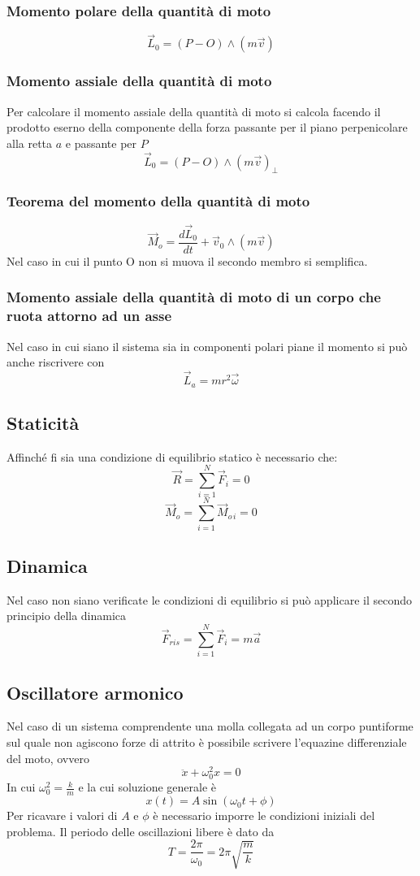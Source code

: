 \documentclass[12pt,a4paper]{report}
\begin{document}
		\subsubsection{Momento polare della quantità di moto}
		\[\vec{L}_{0}=(P-O)\wedge(m\vec{v})\]
		\subsubsection{Momento assiale della quantità di moto}
Per calcolare il momento assiale della quantità di moto si calcola facendo il prodotto eserno della componente della forza passante per il piano perpenicolare alla retta $a$ e passante per $P$
		\[ \vec{L}_{0}=(P-O)\wedge(m\vec{v})_{\perp} \]
		\subsubsection{Teorema del momento della quantità di moto}
		\[\vec{M}_{o} = \frac{d\vec{L}_{0}}{dt} + \vec{v}_{0}\wedge(m\vec{v})\]
Nel caso in cui il punto O non si muova il secondo membro si semplifica.
		\subsubsection{Momento assiale della quantità di moto di un corpo che ruota attorno ad un asse}
Nel caso in cui siano il sistema sia in componenti polari piane il momento si può anche riscrivere con 
\[\vec{L}_{a}=mr^{2}\vec{\omega}\]
	\subsection{Staticità}
Affinché fi sia una condizione di equilibrio statico è necessario che:
		\[\vec{R}= \sum\limits_{i=1}^N \vec{F}_{i}=0\]
		\[\vec{M}_{o}= \sum\limits_{i=1}^N \vec{M}_{o\,i}=0 \]
	\subsection{Dinamica}	
Nel caso non siano verificate le condizioni di equilibrio si può applicare il secondo principio della dinamica
		\[\vec{F}_{ris}= \sum\limits_{i=1}^N \vec{F}_{i} = m\vec{a}\]
	\subsection{Oscillatore armonico}	
Nel caso di un sistema comprendente una molla collegata ad un corpo puntiforme sul quale non agiscono forze di attrito è possibile scrivere l'equazine differenziale del moto, ovvero
		\[\ddot{x}+\omega_{0}^{2}x=0\]
In cui $\omega_{0}^{2}=\frac{k}{m}$ e la cui soluzione generale è
		\[x(t)=A\sin(\omega_{0}t+\phi)\]
Per ricavare i valori di $A$ e $\phi$ è necessario imporre le condizioni iniziali del problema.
Il periodo delle oscillazioni libere è dato da 
		\[T = \frac{2\pi}{\omega_{0}}= 2\pi\sqrt{\frac{m}{k}}\]
	
\end{document}
